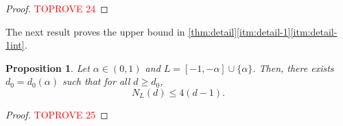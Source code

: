 \documentclass[reqno, 11pt]{amsart}
\newtheorem{proposition}[theorem]{Proposition}
\theoremstyle{definition}
\theoremstyle{remark}
\begin{document}
\begin{proof}\textcolor{red}{TOPROVE 24}\end{proof}

The next result proves the upper bound in \cref{thm:detail}\ref{itm:detail-1}\ref{itm:detail-1int}.

\begin{proposition}\label{prop:upper}
    Let $ \alpha \in (0,1)$ and $L = [-1,-\alpha]\cup\{\alpha\}$. Then, there exists $d_0 = d_0(\alpha)$ such that for all $d \geq d_0$,
    \[
        N_L(d) \leq 4(d-1).
    \]
\end{proposition}

\begin{proof}\textcolor{red}{TOPROVE 25}\end{proof}




\end{document}
